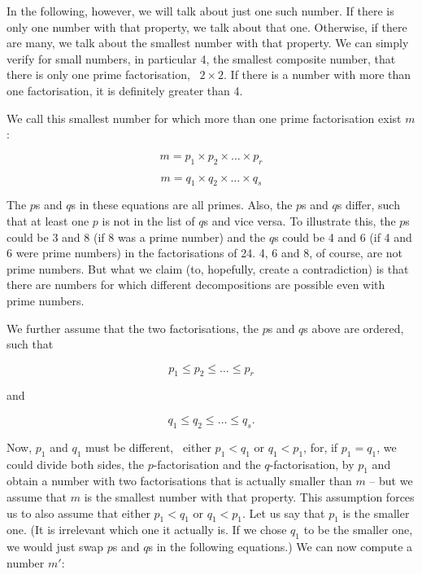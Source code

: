 \documentclass{scrreprt}
\begin{document}
In the following, however,
we will talk about just one such number.
If there is only one number with that property,
we talk about that one. Otherwise,
if there are many, we talk about the smallest number
with that property.
We can simply verify for small numbers, in particular 4,
the smallest composite number,
that there is only one prime factorisation, \ie\ $2 \times 2$.
If there is a number with more than one factorisation,
it is definitely greater than 4.

We call this smallest number
for which more than one prime factorisation exist
 $m$:

\begin{equation}
m = p_1 \times p_2 \times \dots \times p_r 
\end{equation}

\begin{equation}
m = q_1 \times q_2 \times \dots \times q_s 
\end{equation}

The $p$s and $q$s in these equations are all primes.
Also, the $p$s and $q$s differ, such that at least
one $p$ is not in the list of $q$s and vice versa.
To illustrate this, the $p$s could be 3 and 8
(if 8 was a prime number) and the $q$s could be
4 and 6 (if 4 and 6 were prime numbers) in
the factorisations of 24.
4, 6 and 8, of course, are not prime numbers.
But what we claim
(to, hopefully, create a contradiction) is
that there are numbers for which different decompositions 
are possible even with prime numbers.

We further assume that the two factorisations,
the $p$s and $q$s above are ordered, such that

\[
p_1 \le p_2 \le \dots \le p_r
\]

and

\[
q_1 \le q_2 \le \dots \le q_s.
\]

Now, $p_1$ and $q_1$ must be different,
\ie\ either $p_1 < q_1$ or $q_1 < p_1$,
for, if $p_1 = q_1$, we could divide both sides,
the $p$-factorisation and the $q$-factorisation,
by $p_1$ and obtain a number with two factorisations
that is actually smaller than $m$ -- but we assume that $m$ is
the smallest number with that property.
This assumption forces us to also assume that either
$p_1 < q_1$ or $q_1 < p_1$.
Let us say that $p_1$ is the smaller one.
(It is irrelevant which one it actually is.
If we chose $q_1$ to be the smaller one,
we would just swap $p$s and $q$s in the following equations.) 
We can now compute a number $m'$:
\end{document}
